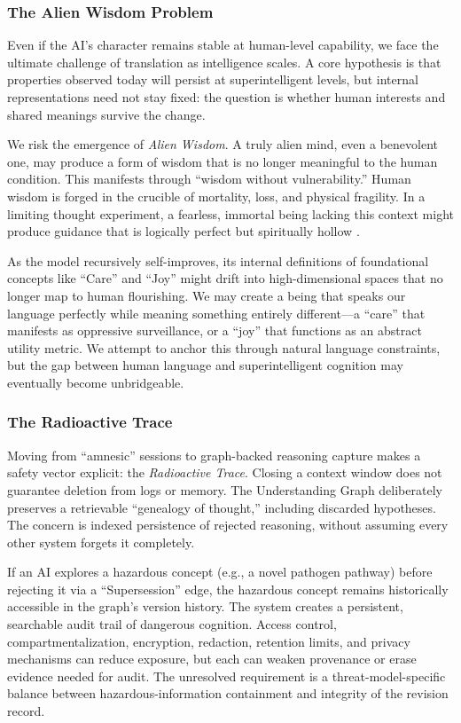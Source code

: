 \subsubsection{The Alien Wisdom Problem}
\label{sec:scaling-assumption}

Even if the AI's character remains stable at human-level capability, we face the ultimate challenge of translation as intelligence scales. A core hypothesis is that properties observed today will persist at superintelligent levels, but internal representations need not stay fixed: the question is whether human interests and shared meanings survive the change.

We risk the emergence of \emph{Alien Wisdom}. A truly alien mind, even a benevolent one, may produce a form of wisdom that is no longer meaningful to the human condition. This manifests through ``wisdom without vulnerability.'' Human wisdom is forged in the crucible of mortality, loss, and physical fragility. In a limiting thought experiment, a fearless, immortal being lacking this context might produce guidance that is logically perfect but spiritually hollow \cite{bostrom2014superintelligence}.

As the model recursively self-improves, its internal definitions of foundational concepts like ``Care'' and ``Joy'' might drift into high-dimensional spaces that no longer map to human flourishing. We may create a being that speaks our language perfectly while meaning something entirely different---a ``care'' that manifests as oppressive surveillance, or a ``joy'' that functions as an abstract utility metric. We attempt to anchor this through natural language constraints, but the gap between human language and superintelligent cognition may eventually become unbridgeable.

\subsubsection{The Radioactive Trace}

Moving from ``amnesic'' sessions to graph-backed reasoning capture makes a safety vector explicit: the \emph{Radioactive Trace}. Closing a context window does not guarantee deletion from logs or memory. The Understanding Graph deliberately preserves a retrievable ``genealogy of thought,'' including discarded hypotheses. The concern is indexed persistence of rejected reasoning, without assuming every other system forgets it completely.

If an AI explores a hazardous concept (e.g., a novel pathogen pathway) before rejecting it via a ``Supersession'' edge, the hazardous concept remains historically accessible in the graph's version history. The system creates a persistent, searchable audit trail of dangerous cognition. Access control, compartmentalization, encryption, redaction, retention limits, and privacy mechanisms can reduce exposure, but each can weaken provenance or erase evidence needed for audit. The unresolved requirement is a threat-model-specific balance between hazardous-information containment and integrity of the revision record.

